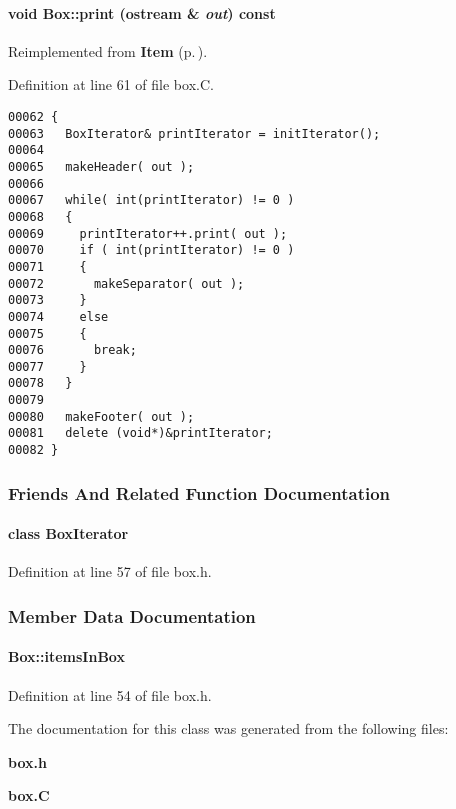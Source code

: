 \paragraph{\setlength{\rightskip}{0pt plus 5cm}void Box::print (ostream \& {\em out}) const\hspace{0.3cm}{\tt  [virtual]}}\hfill



Reimplemented from {\bf Item} {\rm (p.\,\pageref{Item_a8})}.

Definition at line 61 of file box.C.\small\begin{verbatim}00062 {
00063   BoxIterator& printIterator = initIterator();
00064   
00065   makeHeader( out );
00066   
00067   while( int(printIterator) != 0 )
00068   {
00069     printIterator++.print( out );
00070     if ( int(printIterator) != 0 )
00071     {
00072       makeSeparator( out );
00073     }
00074     else 
00075     {
00076       break;
00077     }
00078   } 
00079   
00080   makeFooter( out );
00081   delete (void*)&printIterator;
00082 }
\end{verbatim}\normalsize 


\subsubsection{Friends And Related Function Documentation}
\label{Box_l0}
\paragraph{\setlength{\rightskip}{0pt plus 5cm}class Box\-Iterator\hspace{0.3cm}{\tt  [friend]}}\hfill



Definition at line 57 of file box.h.

\subsubsection{Member Data Documentation}
\label{Box_n0}
\paragraph{ Box::items\-In\-Box\hspace{0.3cm}{\tt  [protected]}}\hfill



Definition at line 54 of file box.h.

The documentation for this class was generated from the following files:\begin{CompactItemize}
\item 
{\bf box.h}\item 
{\bf box.C}\end{CompactItemize}
